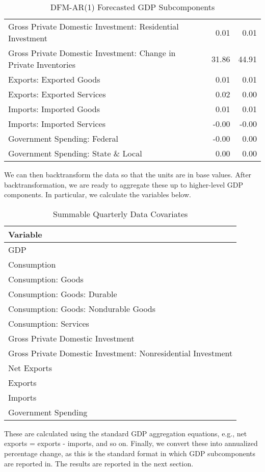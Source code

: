 \documentclass[11pt, letterpaper]{article}\usepackage[]{graphicx}\usepackage[]{color}
\begin{document}
\begin{table}[H]
\begin{tabular}{lrr}
  Gross Private Domestic Investment: Residential Investment & 0.01 & 0.01 \\ 
  Gross Private Domestic Investment: Change in Private Inventories & 31.86 & 44.91 \\ 
  Exports: Exported Goods & 0.01 & 0.01 \\ 
  Exports: Exported Services & 0.02 & 0.00 \\ 
  Imports: Imported Goods & 0.01 & 0.01 \\ 
  Imports: Imported Services & -0.00 & -0.00 \\ 
  Government Spending: Federal & -0.00 & 0.00 \\ 
  Government Spending: State \& Local & 0.00 & 0.00 \\ 
   \hline
\end{tabular}
\endgroup
\caption{DFM-AR(1) Forecasted GDP Subcomponents} 
\end{table}


We can then backtransform the data so that the units are in base values. After backtransformation, we are ready to aggregate these up to higher-level GDP components. In particular, we calculate the variables below.
\begin{table}[H]
\centering
\begingroup\scriptsize
\begin{tabular}{l}
  \hline
Variable \\ 
  \hline
GDP \\ 
  Consumption \\ 
  Consumption: Goods \\ 
  Consumption: Goods: Durable \\ 
  Consumption: Goods: Nondurable Goods \\ 
  Consumption: Services \\ 
  Gross Private Domestic Investment \\ 
  Gross Private Domestic Investment: Nonresidential Investment \\ 
  Net Exports \\ 
  Exports \\ 
  Imports \\ 
  Government Spending \\ 
   \hline
\end{tabular}
\endgroup
\caption{Summable Quarterly Data Covariates} 
\end{table}

These are calculated using the standard GDP aggregation equations, e.g., net exports = exports - imports, and so on.
Finally, we convert these into annualized percentage change, as this is the standard format in which GDP subcomponents are reported in. The results are reported in the next section.
\end{document}

